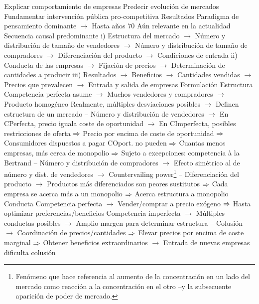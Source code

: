 \documentclass{nuevotema}
\begin{document}
\begin{esquemal}
				\4[] Explicar comportamiento de empresas
				\4[] Predecir evolución de mercados
				\4[] Fundamentar intervención pública pro-competitiva
				\4 Resultados
				\4[] Paradigma de pensamiento dominante
				\4[] $\to$ Hasta años 70
				\4[] Aún relevante en la actualidad
				\4[] Secuencia causal predominante
				\4[] i) Estructura del mercado
				\4[] $\to$ Número y distribución de tamaño de vendedores
				\4[] $\to$ Número y distribución de tamaño de compradores
				\4[] $\to$ Diferenciación del producto
				\4[] $\to$ Condiciones de entrada
				\4[] ii) Conducta de las empresas
				\4[] $\to$ Fijación de precios
				\4[] $\to$ Determinación de cantidades a producir
				\4[] iii) Resultados
				\4[] $\to$ Beneficios
				\4[] $\to$ Cantidades vendidas
				\4[] $\to$ Precios que prevalecen
				\4[] $\to$ Entrada y salida de empresas
			\3 Formulación
				\4 Estructura
				\4[] Competencia perfecta asume
				\4[] $\to$ Muchos vendedores y compradores
				\4[] $\to$ Producto homogéneo
				\4[] Realmente, múltiples desviaciones posibles
				\4[] $\to$ Definen estructura de un mercado
				\4[] -- Número y distribución de vendedores
				\4[] $\to$ En CPerfecta, precio iguala coste de oportunidad
				\4[] $\to$ En CImperfecta, posibles restricciones de oferta
				\4[] $\Rightarrow$ Precio por encima de coste de oportunidad
				\4[] $\Rightarrow$ Consumidores dispuestos a pagar COport. no pueden
				\4[] $\Rightarrow$ Cuantas menos empresas, más cerca de monopolio
				\4[] $\Rightarrow$ Sujeto a excepciones: competencia à la Bertrand
				\4[] -- Número y distribución de compradores
				\4[] $\to$ Efecto simétrico al de número y dist. de vendedores
				\4[] $\to$ Countervailing power\footnote{Fenómeno que hace referencia al aumento de la concentración en un lado del mercado como reacción a la concentración en el otro --y la subsecuente aparición de poder de mercado.}
				\4[] -- Diferenciación del producto
				\4[] $\to$ Productos más diferenciados son peores sustitutos
				\4[] $\Rightarrow$ Cada empresa se acerca más a un monopolio
				\4[] $\Rightarrow$ Acerca estructura a monopolio
				\4 Conducta
				\4[] Competencia perfecta
				\4[] $\to$ Vender/comprar a precio exógeno
				\4[] $\Rightarrow$ Hasta optimizar preferencias/beneficios
				\4[] Competencia imperfecta
				\4[] $\to$ Múltiples conductas posibles
				\4[] $\to$ Amplio margen para determinar estructura
				\4[] -- Colusión
				\4[] $\to$ Coordinación de precios/cantidades
				\4[] $\Rightarrow$ Elevar precios por encima de coste marginal
				\4[] $\Rightarrow$ Obtener beneficios extraordinarios
				\4[] $\to$ Entrada de nuevas empresas dificulta colusión

\end{esquemal}
\end{document}
